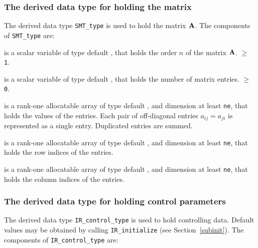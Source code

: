 \documentclass{galahad}
\newcommand{\packagename}{IR}
\begin{document}

\subsubsection{The derived data type for holding the matrix}\label{typeprob}
The derived data type {\tt SMT\_type} is used to hold the matrix ${\mathbf{A}}$.
The components of {\tt SMT\_type} are:

\begin{description}

 is a scalar variable of type default \integer, that holds
the order $n$ of the matrix  ${\mathbf{A}}$.
 $\geq$ {\tt 1}.

 is a scalar variable of type default \integer, that holds the
number of matrix entries.
 $\geq$ {\tt 0}.

 is a rank-one allocatable array of type default \realdp,
and dimension at least {\tt ne}, that holds the values of the entries.
Each pair of off-diagonal entries $a_{ij} = a_{ji} $
is represented as a single entry. Duplicated entries are summed.

 is a rank-one allocatable array of type default \integer,
and dimension at least {\tt ne}, that holds the row indices of the entries.

 is a rank-one allocatable array of type default \integer,
and dimension at least {\tt ne}, that holds the column indices of the entries.

\end{description}


\subsubsection{The derived data type for holding control
 parameters}\label{typecontrol}
The derived data type
{\tt \packagename\_control\_type}
is used to hold controlling data. Default values may be obtained by calling
{\tt \packagename\_initialize}
(see Section~\ref{subinit}). The components of
{\tt \packagename\_control\_type}
are:
\end{document}
